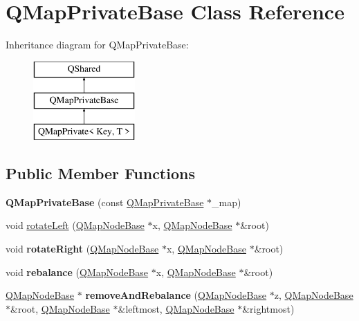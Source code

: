 \hypertarget{class_q_map_private_base}{}\section{Q\+Map\+Private\+Base Class Reference}
\label{class_q_map_private_base}
Inheritance diagram for Q\+Map\+Private\+Base\+:\begin{figure}[H]
\begin{center}
\leavevmode
\includegraphics[height=3.000000cm]{class_q_map_private_base}
\end{center}
\end{figure}
\subsection*{Public Member Functions}
\begin{DoxyCompactItemize}
\item 
\mbox{\label{class_q_map_private_base_ac204e3463e15fd14e08affde54af3eff}} 
{\bfseries Q\+Map\+Private\+Base} (const \mbox{\hyperlink{class_q_map_private_base}{Q\+Map\+Private\+Base}} $\ast$\+\_\+map)
\item 
void \mbox{\hyperlink{class_q_map_private_base_adda5f2da31d0938d52b2d17ed8e5aac5}{rotate\+Left}} (\mbox{\hyperlink{struct_q_map_node_base}{Q\+Map\+Node\+Base}} $\ast$x, \mbox{\hyperlink{struct_q_map_node_base}{Q\+Map\+Node\+Base}} $\ast$\&root)
\item 
\mbox{\label{class_q_map_private_base_a25607364c3ed27ea255a589fcb798053}} 
void {\bfseries rotate\+Right} (\mbox{\hyperlink{struct_q_map_node_base}{Q\+Map\+Node\+Base}} $\ast$x, \mbox{\hyperlink{struct_q_map_node_base}{Q\+Map\+Node\+Base}} $\ast$\&root)
\item 
\mbox{\label{class_q_map_private_base_a3c74c06a129b7d4f2a7d455cf7b0b515}} 
void {\bfseries rebalance} (\mbox{\hyperlink{struct_q_map_node_base}{Q\+Map\+Node\+Base}} $\ast$x, \mbox{\hyperlink{struct_q_map_node_base}{Q\+Map\+Node\+Base}} $\ast$\&root)
\item 
\mbox{\label{class_q_map_private_base_a5a142ce0ac3574dec21ce5766fca12ce}} 
\mbox{\hyperlink{struct_q_map_node_base}{Q\+Map\+Node\+Base}} $\ast$ {\bfseries remove\+And\+Rebalance} (\mbox{\hyperlink{struct_q_map_node_base}{Q\+Map\+Node\+Base}} $\ast$z, \mbox{\hyperlink{struct_q_map_node_base}{Q\+Map\+Node\+Base}} $\ast$\&root, \mbox{\hyperlink{struct_q_map_node_base}{Q\+Map\+Node\+Base}} $\ast$\&leftmost, \mbox{\hyperlink{struct_q_map_node_base}{Q\+Map\+Node\+Base}} $\ast$\&rightmost)
\end{DoxyCompactItemize}
